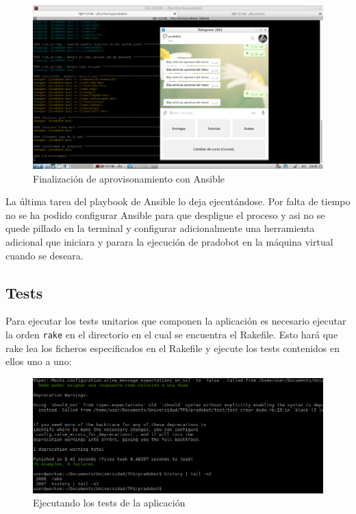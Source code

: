 \begin{figure}[H] %
\centering
\includegraphics[scale=0.3]{imagenes/random/123bot2.png}  %

\caption{Finalización de aprovisonamiento con Ansible}\label{figura94}

\end{figure}

La última tarea del playbook de Ansible lo deja ejecutándose. Por falta de tiempo no se ha podido configurar Ansible para que despligue el proceso y asi no se quede pillado en la terminal y configurar adicionalmente una herramienta adicional que iniciara y parara la ejecución de pradobot en la máquina virtual cuando se deseara.



\subsection{Tests}

Para ejecutar los tests unitarios que componen la aplicación es necesario ejecutar la orden \texttt{rake} en el directorio en el cual se encuentra el Rakefile. Esto hará que rake lea los ficheros especificados en el Rakefile y ejecute los tests contenidos en ellos uno a uno:

\begin{figure}[H] %
\centering
\includegraphics[scale=0.4]{imagenes/random/Screenshot_2017-08-30_16-40-12.png}  %

\caption{Ejecutando los tests de la aplicación}\label{figura92}

\end{figure}

